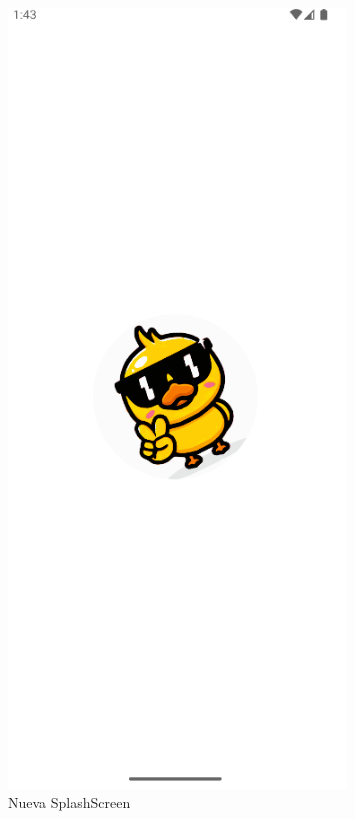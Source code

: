 \documentclass[a4paper,openright,12pt]{article}
\begin{document}
\begin{figure}[htp]
    \centering
    \begin{minipage}{0.3\textwidth}
        \centering
        \includegraphics[width=0.8\textwidth]{Images/Vista_It3_3.png} 
        \caption{Nueva SplashScreen}
        \label{fig:figura2}
    \end{minipage}
    \hfill
    \begin{minipage}{0.3\textwidth}

\end{minipage}
\end{figure}
\end{document}
